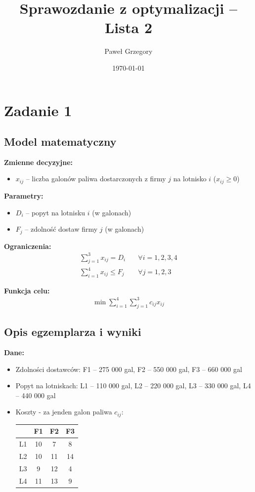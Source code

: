 \documentclass[a4paper,12pt]{article}
\title{Sprawozdanie z optymalizacji -- Lista 2}
\author{Paweł Grzegory}
\date{\today}
\begin{document}
\maketitle


\section*{Zadanie 1}
\subsection*{Model matematyczny}

\textbf{Zmienne decyzyjne:}
\begin{itemize}
\item $x_{ij}$ -- liczba galonów paliwa dostarczonych z firmy $j$ na lotnisko $i$ ($x_{ij} \geq 0$)
\end{itemize}

\textbf{Parametry:}
\begin{itemize}
\item $D_i$ -- popyt na lotnisku $i$ (w galonach)
\item $F_j$ -- zdolność dostaw firmy $j$ (w galonach)
\end{itemize}

\textbf{Ograniczenia:}
\begin{align*}
\sum_{j=1}^{3} x_{ij} = D_i \quad &\forall i=1,2,3,4 \\
\sum_{i=1}^{4} x_{ij} \leq F_j \quad &\forall j=1,2,3
\end{align*}

\textbf{Funkcja celu:}
\begin{align*}
\min \sum_{i=1}^{4} \sum_{j=1}^{3} c_{ij} x_{ij}
\end{align*}

\subsection*{Opis egzemplarza i wyniki}

\textbf{Dane:}
\begin{itemize}
\item Zdolności dostawców: F1 -- 275 000 gal, F2 -- 550 000 gal, F3 -- 660 000 gal
\item Popyt na lotniskach: L1 -- 110 000 gal, L2 -- 220 000 gal, L3 -- 330 000 gal, L4 -- 440 000 gal
\item Koszty - za jenden galon paliwa $c_{ij}$:
\begin{center}
\begin{tabular}{c|ccc}
& F1 & F2 & F3 \\
\hline
L1 & 10 & 7 & 8 \\
L2 & 10 & 11 & 14 \\
L3 & 9 & 12 & 4 \\
L4 & 11 & 13 & 9 \\
\end{tabular}
\end{center}
\end{itemize}
\end{document}
